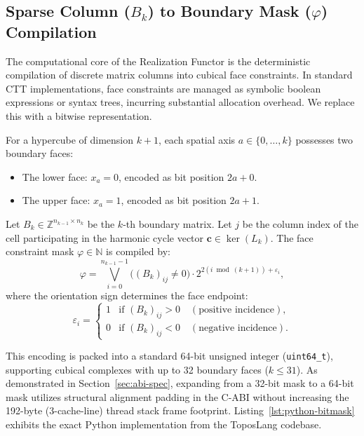 \documentclass[acmsmall,screen,nonacm]{acmart}
\begin{document}
\subsection{Sparse Column ($B_k$) to Boundary Mask ($\varphi$) Compilation}
\label{sec:bitmask-compilation}

The computational core of the Realization Functor is the deterministic compilation of discrete matrix columns into cubical face constraints. In standard CTT implementations, face constraints are managed as symbolic boolean expressions or syntax trees, incurring substantial allocation overhead. We replace this with a bitwise representation.

For a hypercube of dimension $k+1$, each spatial axis $a \in \{0, \dots, k\}$ possesses two boundary faces:
\begin{itemize}
    \item The lower face: $x_a = 0$, encoded as bit position $2a + 0$.
    \item The upper face: $x_a = 1$, encoded as bit position $2a + 1$.
\end{itemize}

\begin{definition}
Let $B_k \in \mathbb{Z}^{n_{k-1} \times n_k}$ be the $k$-th boundary matrix. Let $j$ be the column index of the cell participating in the harmonic cycle vector $\mathbf{c} \in \ker(L_k)$. The face constraint mask $\varphi \in \mathbb{N}$ is compiled by:
\[
  \varphi = \bigvee_{i=0}^{n_{k-1}-1} \Big( (B_k)_{ij} \neq 0 \Big) \cdot 2^{2(i \bmod (k+1)) + \varepsilon_i},
\]
where the orientation sign determines the face endpoint:
\[
  \varepsilon_i = \begin{cases}
    1 & \text{if } (B_k)_{ij} > 0 \quad (\text{positive incidence}), \\
    0 & \text{if } (B_k)_{ij} < 0 \quad (\text{negative incidence}).
  \end{cases}
\]
\end{definition}

This encoding is packed into a standard 64-bit unsigned integer (\texttt{uint64\_t}), supporting cubical complexes with up to 32 boundary faces ($k \le 31$). As demonstrated in Section~\ref{sec:abi-spec}, expanding from a 32-bit mask to a 64-bit mask utilizes structural alignment padding in the C-ABI without increasing the 192-byte (3-cache-line) thread stack frame footprint. Listing~\ref{lst:python-bitmask} exhibits the exact Python implementation from the ToposLang codebase.
\end{document}
